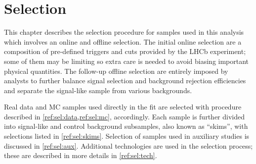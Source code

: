 \chapter{Selection}
\label{ref:sel}

This chapter describes the selection procedure for samples used in this
analysis which involves an online and offline selection.
The initial online selection are a composition of
pre-defined triggers and cuts provided by the LHCb experiment;
some of them may be limiting so extra care is needed to avoid biasing important
physical quantities.
The follow-up offline selection are entirely imposed by analysts
to further balance signal selection and background rejection efficiencies
and separate the signal-like sample from various backgrounds.

Real data and MC samples used directly in the fit are selected with procedure
described in \cref{ref:sel:data,ref:sel:mc}, accordingly.
Each sample is further divided into signal-like and control background
subsamples, also known as ``skims'', with selections listed in
\cref{ref:sel:skims}.
Selection of samples used in auxiliary studies is discussed in
\cref{ref:sel:aux}.
Additional technologies are used in the selection process;
these are described in more details in
\cref{ref:sel:tech}.









%
%
%



